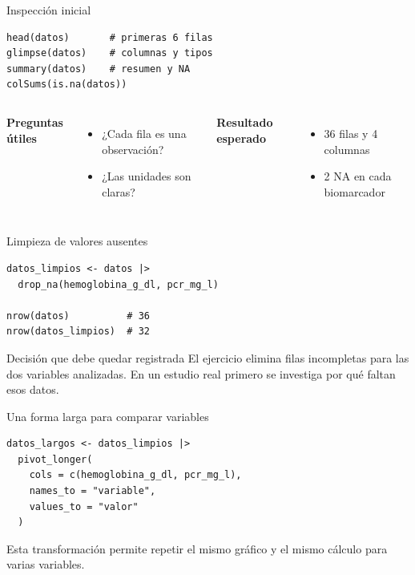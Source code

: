 \documentclass[aspectratio=169,11pt]{beamer}
\begin{document}
\begin{frame}[fragile]{Inspección inicial}
\begin{lstlisting}
head(datos)       # primeras 6 filas
glimpse(datos)    # columnas y tipos
summary(datos)    # resumen y NA
colSums(is.na(datos))
\end{lstlisting}

\vspace{0.25cm}
\begin{columns}[T,onlytextwidth]
  \textbf{Preguntas útiles}
  \begin{itemize}
    \item ¿Cada fila es una observación?
    \item ¿Las unidades son claras?
  \end{itemize}
  \textbf{Resultado esperado}
  \begin{itemize}
    \item 36 filas y 4 columnas
    \item 2 NA en cada biomarcador
  \end{itemize}
\end{columns}
\end{frame}

\begin{frame}[fragile]{Limpieza de valores ausentes}
\begin{lstlisting}
datos_limpios <- datos |>
  drop_na(hemoglobina_g_dl, pcr_mg_l)

nrow(datos)          # 36
nrow(datos_limpios)  # 32
\end{lstlisting}

\vspace{0.35cm}
\begin{block}{Decisión que debe quedar registrada}
El ejercicio elimina filas incompletas para las dos variables analizadas. En un estudio real primero se investiga por qué faltan esos datos.
\end{block}
\end{frame}

\begin{frame}[fragile]{Una forma larga para comparar variables}
\begin{lstlisting}
datos_largos <- datos_limpios |>
  pivot_longer(
    cols = c(hemoglobina_g_dl, pcr_mg_l),
    names_to = "variable",
    values_to = "valor"
  )
\end{lstlisting}

\vspace{0.35cm}
\large Esta transformación permite repetir el mismo gráfico y el mismo cálculo para varias variables.
\end{frame}
\end{document}
